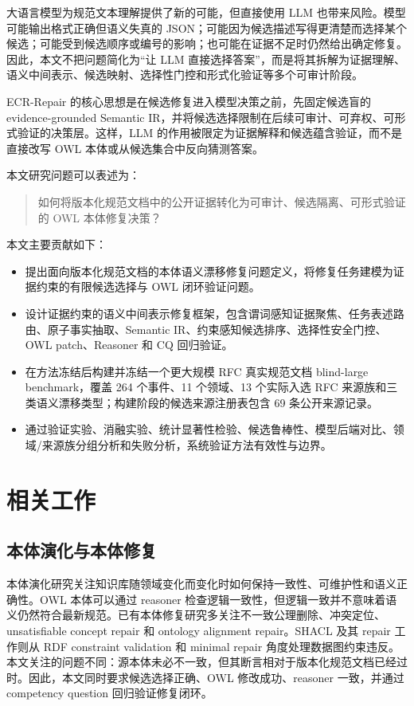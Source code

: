 \documentclass[11pt]{article}
\begin{document}
大语言模型为规范文本理解提供了新的可能，但直接使用 LLM 也带来风险。模型可能输出格式正确但语义失真的 JSON；可能因为候选描述写得更清楚而选择某个候选；可能受到候选顺序或编号的影响；也可能在证据不足时仍然给出确定修复。因此，本文不把问题简化为“让 LLM 直接选择答案”，而是将其拆解为证据理解、语义中间表示、候选映射、选择性门控和形式化验证等多个可审计阶段。

ECR-Repair 的核心思想是在候选修复进入模型决策之前，先固定候选盲的 evidence-grounded Semantic IR，并将候选选择限制在后续可审计、可弃权、可形式验证的决策层。这样，LLM 的作用被限定为证据解释和候选蕴含验证，而不是直接改写 OWL 本体或从候选集合中反向猜测答案。

本文研究问题可以表述为：

\begin{quote}
如何将版本化规范文档中的公开证据转化为可审计、候选隔离、可形式验证的 OWL 本体修复决策？
\end{quote}

本文主要贡献如下：

\begin{itemize}
    \item 提出面向版本化规范文档的本体语义漂移修复问题定义，将修复任务建模为证据约束的有限候选选择与 OWL 闭环验证问题。
    \item 设计证据约束的语义中间表示修复框架，包含谓词感知证据聚焦、任务表述路由、原子事实抽取、Semantic IR、约束感知候选排序、选择性安全门控、OWL patch、Reasoner 和 CQ 回归验证。
    \item 在方法冻结后构建并冻结一个更大规模 RFC 真实规范文档 blind-large benchmark，覆盖 264 个事件、11 个领域、13 个实际入选 RFC 来源族和三类语义漂移类型；构建阶段的候选来源注册表包含 69 条公开来源记录。
    \item 通过验证实验、消融实验、统计显著性检验、候选鲁棒性、模型后端对比、领域/来源族分组分析和失败分析，系统验证方法有效性与边界。
\end{itemize}

\section{相关工作}

\subsection{本体演化与本体修复}

本体演化研究关注知识库随领域变化而变化时如何保持一致性、可维护性和语义正确性\cite{flouris2008ontologychange,hartung2013ontologyevolution}。OWL 本体可以通过 reasoner 检查逻辑一致性\cite{w3cowl2}，但逻辑一致并不意味着语义仍然符合最新规范。已有本体修复研究多关注不一致公理删除、冲突定位、unsatisfiable concept repair 和 ontology alignment repair\cite{kalyanpur2006repair,jimenezruiz2015alignmentrepair}。SHACL 及其 repair 工作则从 RDF constraint validation 和 minimal repair 角度处理数据图约束违反\cite{w3cshacl2017,ahmetaj2022shaclrepair,ahmetaj2025shacllogic}。本文关注的问题不同：源本体未必不一致，但其断言相对于版本化规范文档已经过时。因此，本文同时要求候选选择正确、OWL 修改成功、reasoner 一致，并通过 competency question 回归验证修复闭环。
\end{document}

